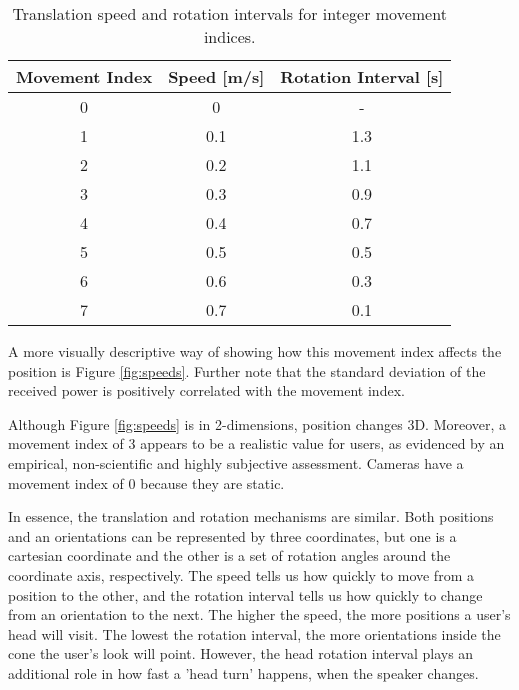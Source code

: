 \begin{table}[htp]
    \centering
    \caption{Translation speed and rotation intervals for integer movement indices.}
    \label{tab:head_speeds}
    \begin{tabular}{|c|c|c|}
    \hline
    Movement Index & Speed {[}m/s{]} & Rotation Interval {[}s{]} \\ \hline
    0              & 0               & -                         \\ \hline
    1              & 0.1             & 1.3                       \\ \hline
    2              & 0.2             & 1.1                       \\ \hline
    3              & 0.3             & 0.9                       \\ \hline
    4              & 0.4             & 0.7                       \\ \hline
    5              & 0.5             & 0.5                       \\ \hline
    6              & 0.6             & 0.3                       \\ \hline
    7              & 0.7             & 0.1                       \\ \hline
    \end{tabular}
\end{table}

\vspace{.5cm}

A more visually descriptive way of showing how this movement index affects the position is Figure \ref{fig:speeds}. Further note that the standard deviation of the received power is positively correlated with the movement index.

Although Figure \ref{fig:speeds} is in 2-dimensions, position changes  3D. Moreover, a movement index of 3 appears to be a realistic value for users, as evidenced by an empirical, non-scientific and highly subjective assessment. Cameras have a movement index of 0 because they are static.


In essence, the translation and rotation mechanisms are similar. Both positions and an orientations can be represented by three coordinates, but one is a cartesian coordinate and the other is a set of rotation angles around the coordinate axis, respectively. The speed tells us how quickly to move from a position to the other, and the rotation interval tells us how quickly to change from an orientation to the next. The higher the speed, the more positions a user's head will visit. The lowest the rotation interval, the more orientations inside the cone the user's look will point. However, the head rotation interval plays an additional role in how fast a 'head turn' happens, when the speaker changes. 


